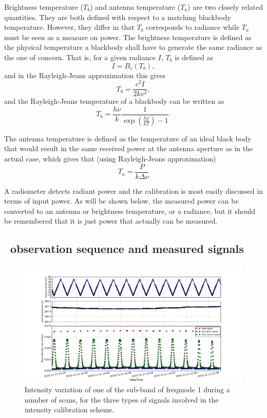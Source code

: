 Brightness temperature (\(T_{b}\)) and antenna temperature (\(T_{a}\))
are two closely related quantities. They are both defined with respect to a 
matching blackbody temperature. However, they differ in that \(T_{b}\) corresponds 
to radiance while \(T_{a}\) must be seen as a measure on power.
The brightness temperature is defined as the physical temperature 
a blackbody shall have to generate the same radiance as the one of concern.
That is, for a given radiance \(I\), \(T_{b}\) is defined as
\begin{equation}
 I = B_{v}(T_{b}),
\end{equation}
and in the Rayleigh-Jeans approximation this gives
\begin{equation}
 T_{b} = \frac{c^{2}I}{2kv^{2}},
\end{equation}
and the Rayleigh-Jeans temperature of a blackbody can be written as 
\begin{equation}
 T_{b} = \frac{h\nu}{k}\frac{1}{\exp(\frac{h\nu}{kT})-1}.  
\end{equation}


The antenna temperature is defined as the temperature of an ideal black
body that would result in the same received power at the antenna aperture 
as in the actual case, which gives that (using Rayleigh-Jeans approximation)
\begin{equation}
T_{a} = \frac{P}{k\Delta \nu}
\end{equation}

A radiometer detects radiant power and the calibration is most 
easily discussed in terms of input power. As will be shown below, 
the measured power can be converted to an
antenna or brightness temperature, or a radiance, but it should be 
remembered that it is just power that actually can be measured.


\subsection{\smr\ observation sequence and measured signals} 
\label{sec:smrobs}

\begin{figure}[t]
\includegraphics[width=14cm]{cal_signals.png}
\caption{ Intensity variation of one of the sub-band of freqmode 1
during a number of scans, for the three types of signals involved
in the intensity calibration scheme.}
\label{fig:intensityvar}
\end{figure}



